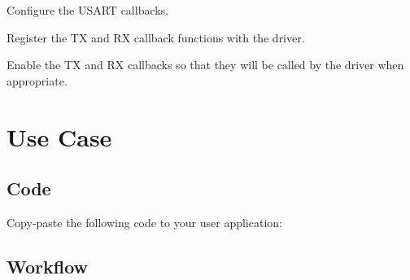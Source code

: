 \begin{DoxyEnumerate}
\begin{DoxyEnumerate}
\end{DoxyEnumerate}
\item Configure the U\+S\+A\+RT callbacks.
\begin{DoxyEnumerate}
\item Register the TX and RX callback functions with the driver. 
\begin{DoxyCodeInclude}{0}
\end{DoxyCodeInclude}

\item Enable the TX and RX callbacks so that they will be called by the driver when appropriate. 
\begin{DoxyCodeInclude}{0}
\end{DoxyCodeInclude}
 
\end{DoxyEnumerate}
\end{DoxyEnumerate}\hypertarget{asfdoc_sam0_sercom_usart_callback_use_case_asfdoc_sam0_usart_callback_use_case_main}{}\section{Use Case}\label{asfdoc_sam0_sercom_usart_callback_use_case_asfdoc_sam0_usart_callback_use_case_main}
\hypertarget{asfdoc_sam0_sercom_usart_callback_use_case_asfdoc_sam0_usart_callback_use_case_main_code}{}\subsection{Code}\label{asfdoc_sam0_sercom_usart_callback_use_case_asfdoc_sam0_usart_callback_use_case_main_code}
Copy-\/paste the following code to your user application\+: 
\begin{DoxyCodeInclude}{0}
\end{DoxyCodeInclude}
 \hypertarget{asfdoc_sam0_sercom_usart_callback_use_case_asfdoc_sam0_usart_callback_use_case_main_flow}{}\subsection{Workflow}\label{asfdoc_sam0_sercom_usart_callback_use_case_asfdoc_sam0_usart_callback_use_case_main_flow}


